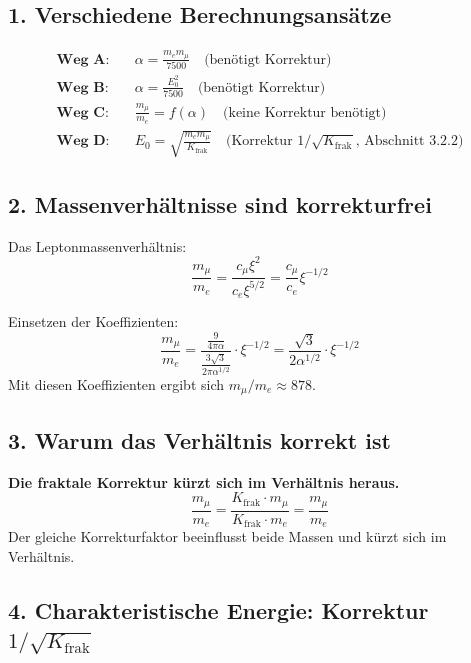 \subsection{1. Verschiedene Berechnungsansätze}

\begin{align*}
	\textbf{Weg A:} &\quad \alpha = \frac{m_e m_\mu}{7500} \quad \text{(benötigt Korrektur)} \\
	\textbf{Weg B:} &\quad \alpha = \frac{E_0^2}{7500} \quad \text{(benötigt Korrektur)} \\
	\textbf{Weg C:} &\quad \frac{m_\mu}{m_e} = f(\alpha) \quad \text{(keine Korrektur benötigt)} \\
	\textbf{Weg D:} &\quad E_0 = \sqrt{\frac{m_e m_\mu}{K_{\text{frak}}}} \quad \text{(Korrektur $1/\sqrt{K_{\text{frak}}}$, Abschnitt~3.2.2)}
\end{align*}

\subsection{2. Massenverhältnisse sind korrekturfrei}

Das Leptonmassenverhältnis:
\[
\frac{m_\mu}{m_e} = \frac{c_\mu \xi^2}{c_e \xi^{5/2}} = \frac{c_\mu}{c_e} \xi^{-1/2}
\]

Einsetzen der Koeffizienten:
\[
\frac{m_\mu}{m_e} = \frac{\frac{9}{4\pi\alpha}}{\frac{3\sqrt{3}}{2\pi\alpha^{1/2}}} \cdot \xi^{-1/2} = \frac{\sqrt{3}}{2\alpha^{1/2}} \cdot \xi^{-1/2}
\]
Mit diesen Koeffizienten ergibt sich $m_\mu/m_e \approx 878$.

\subsection{3. Warum das Verhältnis korrekt ist}

\begin{tcolorbox}[colback=green!5!white,colframe=green!75!black]
	\textbf{Die fraktale Korrektur kürzt sich im Verhältnis heraus.}
	\[
	\frac{m_\mu}{m_e} = \frac{K_{\text{frak}} \cdot m_\mu}{K_{\text{frak}} \cdot m_e} = \frac{m_\mu}{m_e}
	\]
	Der gleiche Korrekturfaktor beeinflusst beide Massen und kürzt sich im Verhältnis.
\end{tcolorbox}

\subsection{4. Charakteristische Energie: Korrektur $1/\sqrt{K_{\text{frak}}}$}

